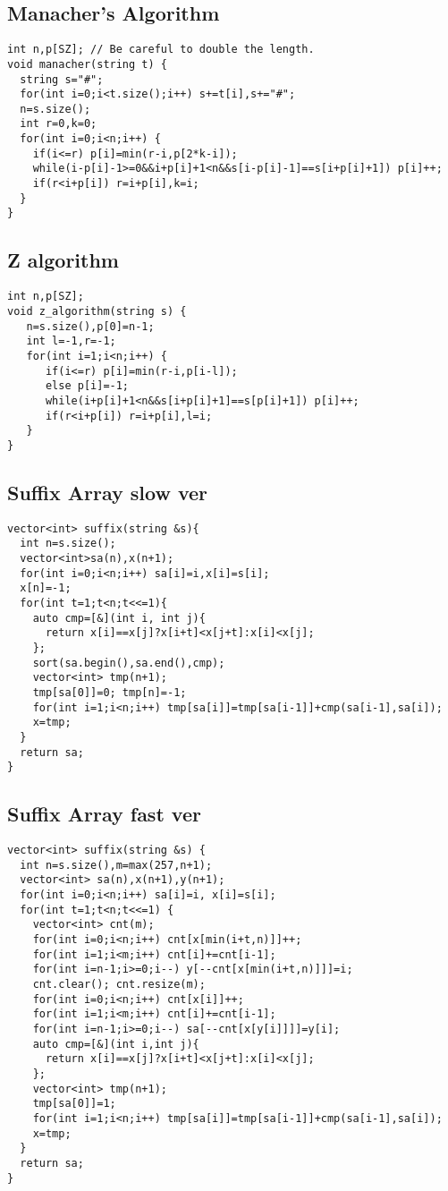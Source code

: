 \documentclass[landscape, 8pt, a4paper, oneside, twocolumn]{extarticle}
\begin{document}
\subsection{Manacher's Algorithm}
\begin{verbatim}
int n,p[SZ]; // Be careful to double the length.
void manacher(string t) {
  string s="#";
  for(int i=0;i<t.size();i++) s+=t[i],s+="#";
  n=s.size();
  int r=0,k=0;
  for(int i=0;i<n;i++) {
    if(i<=r) p[i]=min(r-i,p[2*k-i]);
    while(i-p[i]-1>=0&&i+p[i]+1<n&&s[i-p[i]-1]==s[i+p[i]+1]) p[i]++;
    if(r<i+p[i]) r=i+p[i],k=i;
  }
}
\end{verbatim}

\subsection{Z algorithm}
\begin{verbatim}
int n,p[SZ];
void z_algorithm(string s) {
   n=s.size(),p[0]=n-1;
   int l=-1,r=-1;
   for(int i=1;i<n;i++) {
      if(i<=r) p[i]=min(r-i,p[i-l]);
      else p[i]=-1;
      while(i+p[i]+1<n&&s[i+p[i]+1]==s[p[i]+1]) p[i]++;
      if(r<i+p[i]) r=i+p[i],l=i;
   }
}
\end{verbatim}

\subsection{Suffix Array slow ver}
\begin{verbatim}
vector<int> suffix(string &s){
  int n=s.size();
  vector<int>sa(n),x(n+1);
  for(int i=0;i<n;i++) sa[i]=i,x[i]=s[i];
  x[n]=-1;
  for(int t=1;t<n;t<<=1){
    auto cmp=[&](int i, int j){
      return x[i]==x[j]?x[i+t]<x[j+t]:x[i]<x[j];
    };
    sort(sa.begin(),sa.end(),cmp);
    vector<int> tmp(n+1);
    tmp[sa[0]]=0; tmp[n]=-1;
    for(int i=1;i<n;i++) tmp[sa[i]]=tmp[sa[i-1]]+cmp(sa[i-1],sa[i]);
    x=tmp;
  }
  return sa;
}
\end{verbatim}

\subsection{Suffix Array fast ver}
\begin{verbatim}
vector<int> suffix(string &s) {
  int n=s.size(),m=max(257,n+1);
  vector<int> sa(n),x(n+1),y(n+1);
  for(int i=0;i<n;i++) sa[i]=i, x[i]=s[i];
  for(int t=1;t<n;t<<=1) {
    vector<int> cnt(m);
    for(int i=0;i<n;i++) cnt[x[min(i+t,n)]]++;
    for(int i=1;i<m;i++) cnt[i]+=cnt[i-1];
    for(int i=n-1;i>=0;i--) y[--cnt[x[min(i+t,n)]]]=i;
    cnt.clear(); cnt.resize(m);
    for(int i=0;i<n;i++) cnt[x[i]]++;
    for(int i=1;i<m;i++) cnt[i]+=cnt[i-1];
    for(int i=n-1;i>=0;i--) sa[--cnt[x[y[i]]]]=y[i];
    auto cmp=[&](int i,int j){
      return x[i]==x[j]?x[i+t]<x[j+t]:x[i]<x[j];
    };
    vector<int> tmp(n+1);
    tmp[sa[0]]=1;
    for(int i=1;i<n;i++) tmp[sa[i]]=tmp[sa[i-1]]+cmp(sa[i-1],sa[i]);
    x=tmp;
  }
  return sa;
}
\end{verbatim}
\end{document}
